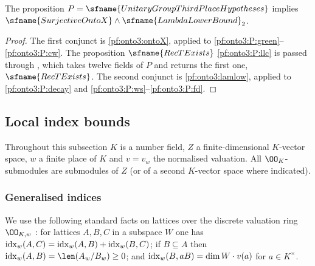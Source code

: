 \begin{theorem}\label{pf:onto3:main}
The proposition $P=\sfname{UnitaryGroupThirdPlaceHypotheses}$ implies
$\sfname{SurjectiveOntoX}\wedge\sfname{LambdaLowerBound}_2$.
\end{theorem}

\begin{proof}
The first conjunct is \cref{pf:onto3:ontoX}, applied to \ref{pf:onto3:P:green}--\ref{pf:onto3:P:cw}. The
proposition $\sfname{RecTExists}$ \ref{pf:onto3:P:llc} is passed through
, which takes twelve fields of $P$ and returns the first one,
$\sfname{RecTExists}$. The second conjunct is \cref{pf:onto3:lamlow}, applied to \ref{pf:onto3:P:decay} and
\ref{pf:onto3:P:ws}--\ref{pf:onto3:P:fd}.
\end{proof}

\subsection{Local index bounds}\label{sec:pf:onto3:local}

Throughout this subsection $K$ is a number field, $Z$ a finite-dimensional $K$-vector space, $w$ a finite place
of $K$ and $v=v_w$ the normalised valuation. All $\OO_K$-submodules are submodules of $Z$ (or of a second
$K$-vector space where indicated).

\subsubsection{Generalised indices}

We use the following standard facts on lattices over the discrete valuation ring $\OO_{K,w}$
\cite[Ch.~III, \S1]{Serre1979}: for lattices $A,B,C$ in a subspace $W$ one has
$\operatorname{idx}_w(A,C)=\operatorname{idx}_w(A,B)+\operatorname{idx}_w(B,C)$; if $B\subseteq A$ then
$\ontothreeidx_w(A,B)=\len(A_w/B_w)\ge0$; and $\operatorname{idx}_w(B,aB)=\dim W\cdot v(a)$ for $a\in K^\times$.

